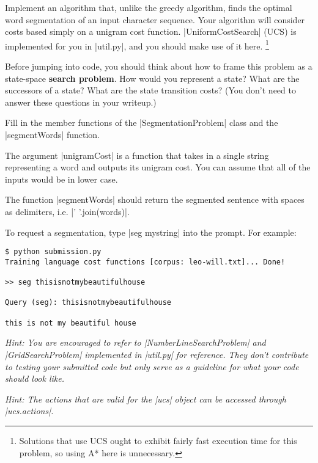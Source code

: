 \item {}
Implement an algorithm that, unlike the greedy algorithm, finds the optimal word
segmentation of an input character sequence. Your algorithm will consider costs
based simply on a unigram cost function. |UniformCostSearch| (UCS) is
implemented for you in |util.py|, and you should make use of it here.
\footnote{Solutions that use UCS ought to exhibit fairly fast execution time for
this problem, so using A* here is unnecessary.}

Before jumping into code, you should think about how to frame this problem as a
state-space {\bf search problem}.  How would you represent a state?  What are
the successors of a state?  What are the state transition costs?  (You don't
need to answer these questions in your writeup.)

Fill in the member functions of the |SegmentationProblem| class and the
|segmentWords| function.

The argument |unigramCost| is a function that takes in a single string
representing a word and outputs its unigram cost. You can assume that all of the
inputs would be in lower case.

The function |segmentWords| should return the segmented sentence with spaces
as delimiters, i.e. |' '.join(words)|.

To request a segmentation, type |seg mystring| into the prompt.  For example:

\begin{lstlisting}
$ python submission.py
Training language cost functions [corpus: leo-will.txt]... Done!

>> seg thisisnotmybeautifulhouse

Query (seg): thisisnotmybeautifulhouse

this is not my beautiful house
\end{lstlisting}

{\em Hint: You are encouraged to refer to |NumberLineSearchProblem| and
|GridSearchProblem| implemented in |util.py| for reference. They don't
contribute to testing your submitted code but only serve as a guideline for what
your code should look like.}

{\em Hint: The actions that are valid for the |ucs| object can be
accessed through |ucs.actions|.}
